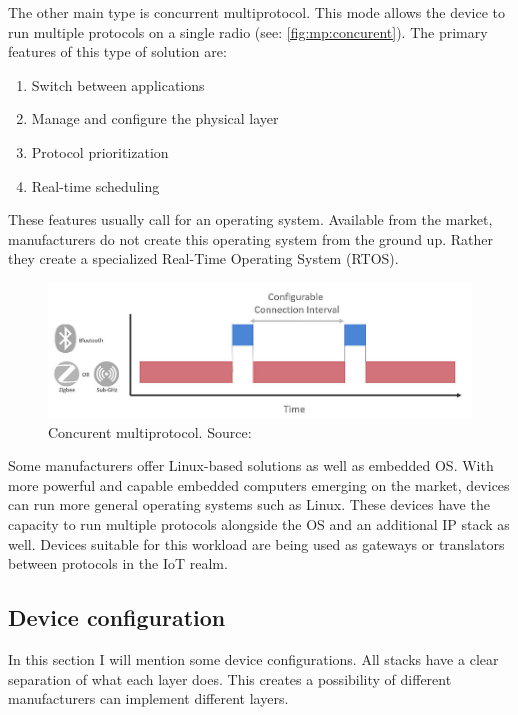 The other main type is concurrent multiprotocol. This mode allows the device to run multiple protocols on a single radio (see: \autoref{fig:mp:concurent}). The primary features of this type of solution are:
\begin{enumerate}
    \item Switch between applications
    \item Manage and configure the physical layer
    \item Protocol prioritization
    \item Real-time scheduling
\end{enumerate}

These features usually call for an operating system. Available from the market, manufacturers do not create this operating system from the ground up. Rather they create a specialized Real-Time Operating System (RTOS).

\begin{figure}
    \centering
    \includegraphics[width=130mm, keepaspectratio]{figures/silabs-dynamic-multiprotocol-slicing-diagram.png}
    \caption{Concurent multiprotocol. Source: \cite{silabs:mp}}
    \label{fig:mp:concurent}
\end{figure}

Some manufacturers offer Linux-based solutions as well as embedded OS. With more powerful and capable embedded computers emerging on the market, devices can run more general operating systems such as Linux. These devices have the capacity to run multiple protocols alongside the OS and an additional IP stack as well. Devices suitable for this workload are being used as gateways or translators between protocols in the IoT realm.

\subsection{Device configuration}
\label{sec:multi:dc}
In this section I will mention some device configurations. All stacks have a clear separation of what each layer does. This creates a possibility of different manufacturers can implement different layers.

